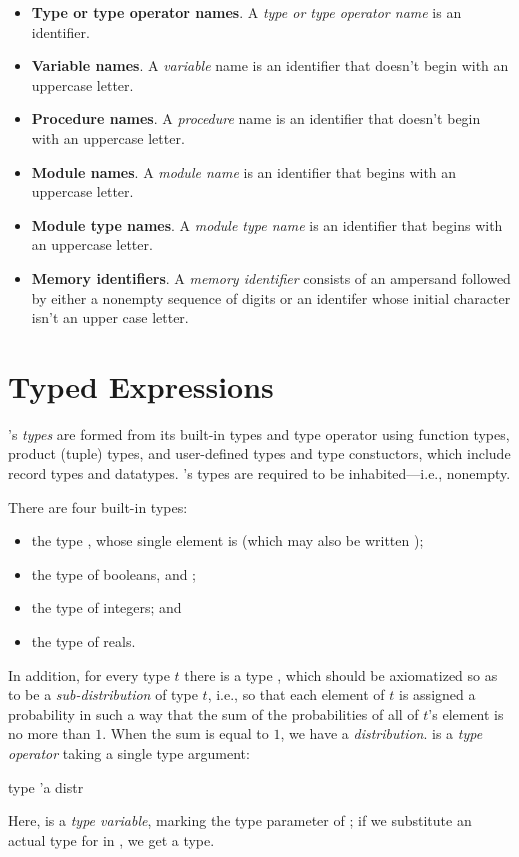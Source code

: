 \begin{itemize}
\item \textbf{Type or type operator names}. A \emph{type or type
  operator name} is an identifier.

\item \textbf{Variable names}. A \emph{variable} name is an identifier
  that doesn't begin with an uppercase letter.

\item \textbf{Procedure names}. A \emph{procedure} name is an identifier
  that doesn't begin with an uppercase letter.

\item \textbf{Module names}. A \emph{module name} is an identifier that
  begins with an uppercase letter.

\item \textbf{Module type names}. A \emph{module type name} is an
  identifier that begins with an uppercase letter.

\item \textbf{Memory identifiers}. A \emph{memory identifier} consists
of an ampersand followed by either a nonempty sequence of digits or
an identifer whose initial character isn't an upper case letter.

\end{itemize}

\section{Typed Expressions}

\EasyCrypt's \emph{types} are formed from its built-in types and
type operator using function types, product (tuple) types, and
user-defined types and type constuctors, which include record types
and datatypes. \EasyCrypt's types are required to be inhabited---i.e.,
nonempty.

There are four built-in types:
\begin{itemize}
\item the type , whose single element is  (which may
  also be written \ec{()});

\item the type  of booleans,  and ;

\item the type  of integers; and

\item the type  of reals.
\end{itemize}

In addition, for every type $t$ there is a type , which
should be axiomatized so as to be a \emph{sub-distribution} of type
$t$, i.e., so that each element of $t$ is assigned a probability in
such a way that the sum of the probabilities of all of $t$'s element
is no more than $1$. When the sum is equal to $1$, we have a
\emph{distribution}.  is a \emph{type operator} taking a
single type argument:
\begin{easycrypt}{}{}
  type 'a distr
\end{easycrypt}
Here,  is a \emph{type variable}, marking the type parameter of
; if we substitute an actual type for  in ,
we get a type.

